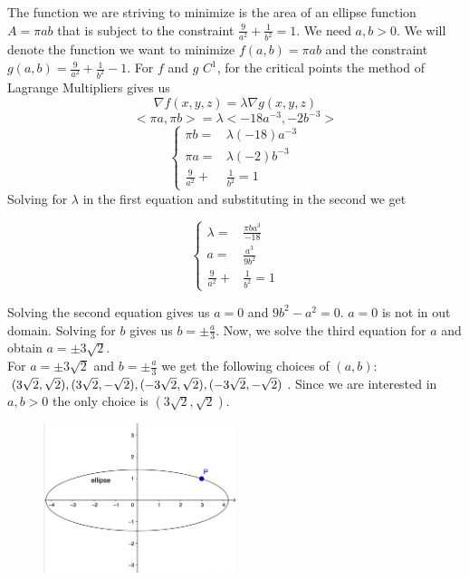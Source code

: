 \documentclass[]{article}
\begin{document}
The function we are striving to minimize is the area of an ellipse function $A=\pi ab$ that is subject to the constraint
$\frac{9}{a^2} + \frac{1}{b^2} = 1$. We need $a,b>0$. We will denote the function we want to minimize $f(a,b)=\pi ab$
and the constraint $g(a,b)=\frac{9}{a^2} + \frac{1}{b^2}-1$. For $f$ and $g$ $C^1$, for the critical points the method of Lagrange Multipliers gives us
$$    
    \nabla f(x,y,z) = \lambda \nabla g(x,y,z)
$$
$$
    <\pi a, \pi b> = \lambda <-18a^{-3}, -2b^{-3}>
$$
\begin{equation*}
    \left\{
    \begin{alignedat}{3}
        \pi b= &\lambda(-18)a^{-3} \\
        \pi a= &\lambda (-2)b^{-3} \\
        \frac{9}{a^2} +& \frac{1}{b^2} = 1
    \end{alignedat}
    \right.
\end{equation*}
Solving for $\lambda$ in the first equation and substituting in the second we get

\begin{equation*}
    \left\{
    \begin{alignedat}{3}
        \lambda= &\frac{\pi ba^{3}}{-18} \\
        a= & \frac{a^3}{9b^2} \\
        \frac{9}{a^2} +& \frac{1}{b^2} = 1
    \end{alignedat}
    \right.
\end{equation*}

Solving the second equation gives us $a=0$ and $9b^2-a^2=0$. $a=0$ is not in out domain. Solving for $b$ gives us $b=\pm \frac{a}{3}$.
Now, we solve the third equation for $a$ and obtain $a=\pm 3\sqrt{2}$.\\
For $a=\pm 3\sqrt{2}$ and $b=\pm \frac{a}{3}$ we get the following choices of $(a,b)$: $(3\sqrt{2}, \sqrt{2}),\\
(3\sqrt{2}, -\sqrt{2}), (-3\sqrt{2}, \sqrt{2}), (-3\sqrt{2}, -\sqrt{2})$.
Since we are interested in $a,b>0$ the only choice is $(3\sqrt{2}, \sqrt{2})$. 

\begin{figure}[h]
    \centering
    \includegraphics[width=0.50\textwidth]{example2.png}
\end{figure}
\end{document}
